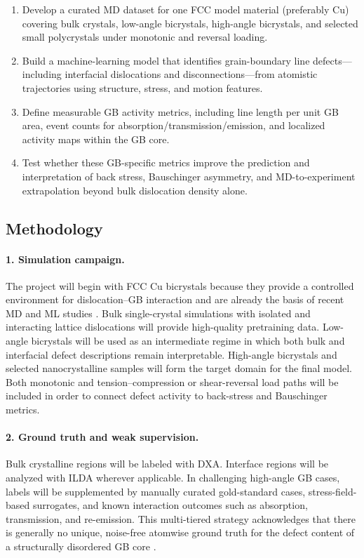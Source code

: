 \documentclass[11pt]{article}
\begin{document}
\begin{enumerate}
    \item Develop a curated MD dataset for one FCC model material (preferably Cu) covering bulk crystals, low-angle bicrystals, high-angle bicrystals, and selected small polycrystals under monotonic and reversal loading.
    \item Build a machine-learning model that identifies grain-boundary line defects---including interfacial dislocations and disconnections---from atomistic trajectories using structure, stress, and motion features.
    \item Define measurable GB activity metrics, including line length per unit GB area, event counts for absorption/transmission/emission, and localized activity maps within the GB core.
    \item Test whether these GB-specific metrics improve the prediction and interpretation of back stress, Bauschinger asymmetry, and MD-to-experiment extrapolation beyond bulk dislocation density alone.
\end{enumerate}

\subsection*{Methodology}
\paragraph{1. Simulation campaign.}
The project will begin with FCC Cu bicrystals because they provide a controlled environment for dislocation--GB interaction and are already the basis of recent MD and ML studies \cite{Noh2024,DGI2025}. Bulk single-crystal simulations with isolated and interacting lattice dislocations will provide high-quality pretraining data. Low-angle bicrystals will be used as an intermediate regime in which both bulk and interfacial defect descriptions remain interpretable. High-angle bicrystals and selected nanocrystalline samples will form the target domain for the final model. Both monotonic and tension--compression or shear-reversal load paths will be included in order to connect defect activity to back-stress and Bauschinger metrics.

\paragraph{2. Ground truth and weak supervision.}
Bulk crystalline regions will be labeled with DXA. Interface regions will be analyzed with ILDA wherever applicable. In challenging high-angle GB cases, labels will be supplemented by manually curated gold-standard cases, stress-field-based surrogates, and known interaction outcomes such as absorption, transmission, and re-emission. This multi-tiered strategy acknowledges that there is generally no unique, noise-free atomwise ground truth for the defect content of a structurally disordered GB core \cite{OVITODXA,Deka2023}.
\end{document}
